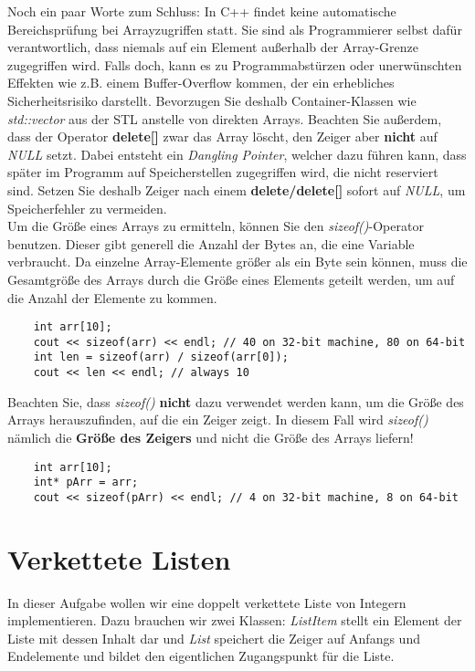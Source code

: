 \documentclass[
  accentcolor=tud1c,	%
  colorbacktitle,		%
  inverttitle,			%
  german,				%
  twoside
]{tudexercise}
\begin{document}
Noch ein paar Worte zum Schluss: In C++ findet keine automatische Bereichsprüfung bei Arrayzugriffen statt. Sie sind als Programmierer selbst dafür verantwortlich, dass niemals auf ein Element außerhalb der Array-Grenze zugegriffen wird. Falls doch, kann es zu Programmabstürzen oder unerwünschten Effekten wie z.B. einem Buffer-Overflow kommen, der ein erhebliches Sicherheitsrisiko darstellt. Bevorzugen Sie deshalb Container-Klassen wie \emph{std::vector} aus der STL anstelle von direkten Arrays. Beachten Sie außerdem, dass der Operator \textbf{delete[]} zwar das Array löscht, den Zeiger aber \textbf{nicht} auf \emph{NULL} setzt. Dabei entsteht ein \emph{Dangling Pointer}, welcher dazu führen kann, dass später im Programm auf Speicherstellen zugegriffen wird, die nicht reserviert sind. Setzen Sie deshalb Zeiger nach einem \textbf{delete/delete[]} sofort auf \emph{NULL}, um Speicherfehler zu vermeiden. \\

Um die Größe eines Arrays zu ermitteln, können Sie den \emph{sizeof()}-Operator benutzen. Dieser gibt generell die Anzahl der Bytes an, die eine Variable verbraucht. Da einzelne Array-Elemente größer als ein Byte sein können, muss die Gesamtgröße des Arrays durch die Größe eines Elements geteilt werden, um auf die Anzahl der Elemente zu kommen.
\begin{lstlisting}
	int arr[10];
	cout << sizeof(arr) << endl; // 40 on 32-bit machine, 80 on 64-bit
	int len = sizeof(arr) / sizeof(arr[0]); 
	cout << len << endl; // always 10
\end{lstlisting}

Beachten Sie, dass \emph{sizeof()} \textbf{nicht} dazu verwendet werden kann, um die Größe des Arrays herauszufinden, auf die ein Zeiger zeigt. In diesem Fall wird \emph{sizeof()} nämlich die \textbf{Größe des Zeigers} und nicht die Größe des Arrays liefern!
\begin{lstlisting}
	int arr[10];
	int* pArr = arr;
	cout << sizeof(pArr) << endl; // 4 on 32-bit machine, 8 on 64-bit
\end{lstlisting}

\section{Verkettete Listen}
In dieser Aufgabe wollen wir eine doppelt verkettete Liste von Integern implementieren. Dazu brauchen wir zwei Klassen: 
\emph{ListItem} stellt ein Element der Liste mit dessen Inhalt dar und \emph{List} speichert die Zeiger auf Anfangs und Endelemente und bildet den eigentlichen Zugangspunkt für die Liste.
\end{document}
